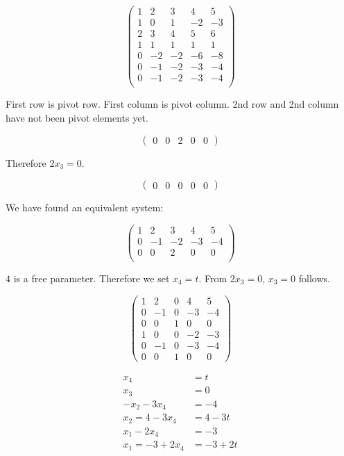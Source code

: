 \documentclass[a4paper,landscape,twocolumn]{article}
\begin{document}
\[
  \left(\begin{array}{cccc|c}
     1 &  2 &  3 &  4 &  5 \\
     1 &  0 &  1 & -2 & -3 \\
     2 &  3 &  4 &  5 &  6 \\
     1 &  1 &  1 &  1 &  1 \\
   \hline
     0 & -2 & -2 & -6 & -8 \\
     0 & -1 & -2 & -3 & -4 \\
     0 & -1 & -2 & -3 & -4 \\
  \end{array}\right)
\]

First row is pivot row. First column is pivot column.
2nd row and 2nd column have not been pivot elements yet.

\[
  \left(\begin{array}{cccc|c}
    0 &  0 &  2 &  0 &  0
  \end{array}\right)
\]

Therefore $2x_3 = 0$.

\[
  \left(\begin{array}{cccc|c}
     0 &  0 &  0 &  0 &  0
  \end{array}\right)
\]

We have found an equivalent system:

\[
  \left(\begin{array}{cccc|c}
     1 &  2 &  3 &  4 &  5 \\
     0 & -1 & -2 & -3 & -4 \\
     0 &  0 &  2 &  0 &  0 \\
  \end{array}\right)
\]

$4$ is a free parameter. Therefore we set $x_4 = t$.
From $2x_3 = 0$, $x_3 = 0$ follows.

\[
  \left(\begin{array}{cccc|c}
     1 &  2 &  0 &  4 &  5 \\
     0 & -1 &  0 & -3 & -4 \\
     0 &  0 &  1 &  0 &  0 \\
   \hline
     1 &  0 &  0 & -2 & -3 \\
     0 & -1 &  0 & -3 & -4 \\
     0 &  0 &  1 &  0 &  0
  \end{array}\right)
\]

\begin{align*}
  x_4 &= t \\
  x_3 &= 0 \\
  -x_2 - 3x_4 &= -4 \\
  x_2 = 4 - 3x_4 &= 4 - 3t \\
  x_1 - 2x_4 &= -3 \\
  x_1 = -3 + 2x_4 &= -3 + 2t
\end{align*}
\end{document}
